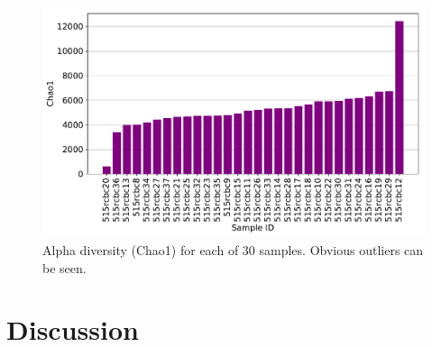 \documentclass[twoside,twocolumn]{article}
\begin{document}
\begin{figure}
	\includegraphics[width=\linewidth]{../analyses/figs/chao1_alpha.pdf}
	\caption{Alpha diversity (Chao1) for each of 30 samples. Obvious outliers can be seen.}
	\label{fig:alpha_diversity}
\end{figure}

\section{Discussion}


\newpage




\end{document}

